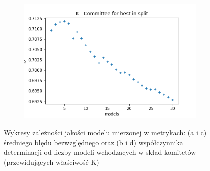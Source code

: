 \begin{figure}
\begin{subfigure}[b]{0.49\textwidth}
         \caption{}
         \label{fig:ea-split-mae-k}
     \end{subfigure}
     \begin{subfigure}[b]{0.49\textwidth}
         \centering
         \includegraphics[width=\textwidth]{images/K_split_r2.png}
         \caption{}
         \label{fig:ea-split-r2-k}
     \end{subfigure}
        \caption{Wykresy zależności jakości modelu mierzonej w metrykach: (a i c) średniego błędu bezwzględnego oraz (b i d) współczynnika determinacji od liczby modeli wchodzacych w skład komitetów (przewidujących właściwość K)}
        \label{fig:k-committee}
\end{figure}

\FloatBarrier

